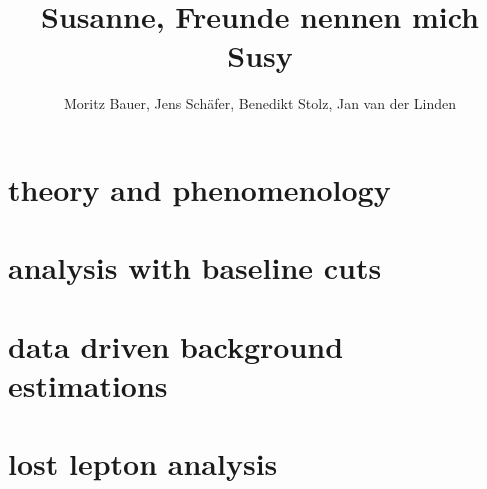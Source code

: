 \documentclass[18pt]{beamer}
\title[SUSY]{Susanne, Freunde nennen mich Susy}
\author{Moritz Bauer, Jens Schäfer, Benedikt Stolz, Jan van der Linden}
\institute{Institut für Experimentelle Teilchenphysik (ETP)}
\begin{document}

\begin{frame}
\titlepage
\end{frame}



\section{theory and phenomenology}

\section{analysis with baseline cuts}

\section{data driven background estimations}

\section{lost lepton analysis}

\end{document}
